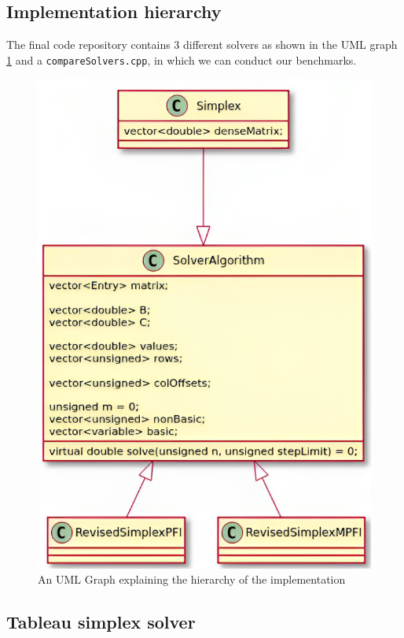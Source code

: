 \subsection{Implementation hierarchy}
The final code repository contains 3 different solvers as shown in the
UML graph \ref{fig:hierarchy}
and a \verb|compareSolvers.cpp|, in which we can conduct our benchmarks.
\begin{figure}[htpb]
    \centering
    \includegraphics[height=0.6\textheight]{figures/UML.png}
    \caption{An UML Graph explaining the hierarchy of the implementation} \label{fig:tumslide}
    \label{fig:hierarchy}
\end{figure}

\subsection{Tableau simplex solver}

